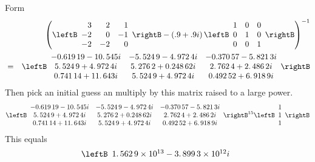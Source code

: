\begin{solution}
Form 
\begin{eqnarray*}
&&\left( \leftB 
\begin{array}{rrr}
3 & 2 & 1 \\ 
-2 & 0 & -1 \\ 
-2 & -2 & 0
\end{array}
\rightB -\left( .9+.9i\right) \leftB 
\begin{array}{rrr}
1 & 0 & 0 \\ 
0 & 1 & 0 \\ 
0 & 0 & 1
\end{array}
\rightB \right) ^{-1} \\
&=&\leftB 
\begin{array}{ccc}
-0.619\,19-10.\,\allowbreak 545i & -5.\,\allowbreak 524\,9-4.\,\allowbreak
972\,4i & -0.370\,57-5.\,\allowbreak 821\,3i \\ 
5.\,\allowbreak 524\,9+4.\,\allowbreak 972\,4i & 5.\,\allowbreak
276\,2+0.248\,62i & 2.\,\allowbreak 762\,4+2.\,\allowbreak 486\,2i \\ 
0.741\,14+11.\,\allowbreak 643i & 5.\,\allowbreak 524\,9+4.\,\allowbreak
972\,4i & 0.492\,52+6.\,\allowbreak 918\,9i%
\end{array}%
\rightB
\end{eqnarray*}
Then pick an initial guess an multiply by this matrix raised to a large
power. 
\begin{equation*}
\leftB 
\begin{array}{ccc}
-0.619\,19-10.\,\allowbreak 545i & -5.\,\allowbreak 524\,9-4.\,\allowbreak
972\,4i & -0.370\,57-5.\,\allowbreak 821\,3i \\ 
5.\,\allowbreak 524\,9+4.\,\allowbreak 972\,4i & 5.\,\allowbreak
276\,2+0.248\,62i & 2.\,\allowbreak 762\,4+2.\,\allowbreak 486\,2i \\ 
0.741\,14+11.\,\allowbreak 643i & 5.\,\allowbreak 524\,9+4.\,\allowbreak
972\,4i & 0.492\,52+6.\,\allowbreak 918\,9i%
\end{array}
\rightB ^{15}\leftB 
\begin{array}{c}
1 \\ 
1 \\ 
1
\end{array}
\rightB
\end{equation*}
This equals 
\begin{equation*}
\leftB 
\begin{array}{c}
1.\,\allowbreak 562\,9\times 10^{13}-3.\,\allowbreak 899\,3\times 10^{12}i
\\ 

\end{array}
\end{equation*}
\end{solution}
